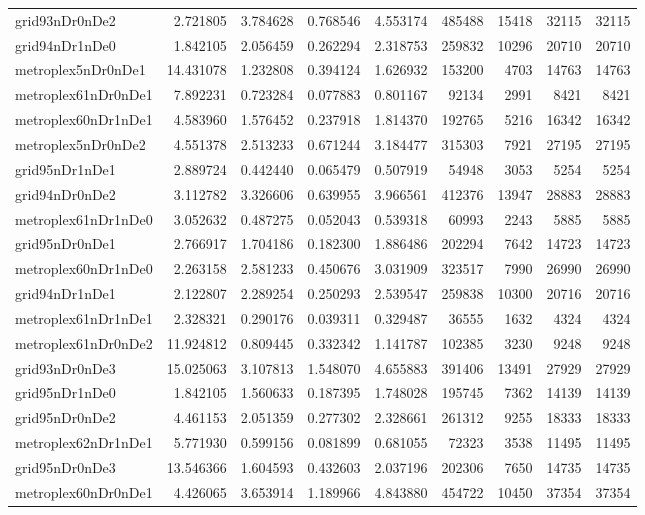 \begin{longtable}{|l|r|r|r|r|r|r|r|r|}
grid93nDr0nDe2 & 2.721805 & 3.784628 & 0.768546 & 4.553174 & 485488 & 15418 & 32115 & 32115 \\
grid94nDr1nDe0 & 1.842105 & 2.056459 & 0.262294 & 2.318753 & 259832 & 10296 & 20710 & 20710 \\
metroplex5nDr0nDe1 & 14.431078 & 1.232808 & 0.394124 & 1.626932 & 153200 & 4703 & 14763 & 14763 \\
metroplex61nDr0nDe1 & 7.892231 & 0.723284 & 0.077883 & 0.801167 & 92134 & 2991 & 8421 & 8421 \\
metroplex60nDr1nDe1 & 4.583960 & 1.576452 & 0.237918 & 1.814370 & 192765 & 5216 & 16342 & 16342 \\
metroplex5nDr0nDe2 & 4.551378 & 2.513233 & 0.671244 & 3.184477 & 315303 & 7921 & 27195 & 27195 \\
grid95nDr1nDe1 & 2.889724 & 0.442440 & 0.065479 & 0.507919 & 54948 & 3053 & 5254 & 5254 \\
grid94nDr0nDe2 & 3.112782 & 3.326606 & 0.639955 & 3.966561 & 412376 & 13947 & 28883 & 28883 \\
metroplex61nDr1nDe0 & 3.052632 & 0.487275 & 0.052043 & 0.539318 & 60993 & 2243 & 5885 & 5885 \\
grid95nDr0nDe1 & 2.766917 & 1.704186 & 0.182300 & 1.886486 & 202294 & 7642 & 14723 & 14723 \\
metroplex60nDr1nDe0 & 2.263158 & 2.581233 & 0.450676 & 3.031909 & 323517 & 7990 & 26990 & 26990 \\
grid94nDr1nDe1 & 2.122807 & 2.289254 & 0.250293 & 2.539547 & 259838 & 10300 & 20716 & 20716 \\
metroplex61nDr1nDe1 & 2.328321 & 0.290176 & 0.039311 & 0.329487 & 36555 & 1632 & 4324 & 4324 \\
metroplex61nDr0nDe2 & 11.924812 & 0.809445 & 0.332342 & 1.141787 & 102385 & 3230 & 9248 & 9248 \\
grid93nDr0nDe3 & 15.025063 & 3.107813 & 1.548070 & 4.655883 & 391406 & 13491 & 27929 & 27929 \\
grid95nDr1nDe0 & 1.842105 & 1.560633 & 0.187395 & 1.748028 & 195745 & 7362 & 14139 & 14139 \\
grid95nDr0nDe2 & 4.461153 & 2.051359 & 0.277302 & 2.328661 & 261312 & 9255 & 18333 & 18333 \\
metroplex62nDr1nDe1 & 5.771930 & 0.599156 & 0.081899 & 0.681055 & 72323 & 3538 & 11495 & 11495 \\
grid95nDr0nDe3 & 13.546366 & 1.604593 & 0.432603 & 2.037196 & 202306 & 7650 & 14735 & 14735 \\
metroplex60nDr0nDe1 & 4.426065 & 3.653914 & 1.189966 & 4.843880 & 454722 & 10450 & 37354 & 37354 \\

\end{longtable}
